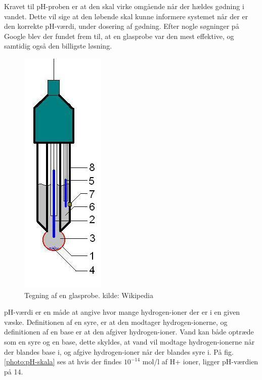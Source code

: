 
Kravet til pH-proben er at den skal virke omgående når der hældes gødning i vandet. Dette vil sige at den løbende skal kunne informere systemet når der er den korrekte pH-værdi, under dosering af gødning. Efter nogle søgninger på Google blev der fundet frem til, at en glasprobe var den mest effektive, og samtidig også den billigste løsning. 

\begin{figure}[H]
	\centering 
	\includegraphics[scale=0.7]{HardwareArkitektur/Sensore/pH_probe_billeder/Glass_electrode_wiki.jpg}
	\caption{Tegning af en glasprobe. kilde: Wikipedia}
	\label{photo:pH-probe}
\end{figure}     

pH-værdi er en måde at angive hvor mange hydrogen-ioner der er i en given væske. Definitionen af en syre, er at den modtager hydrogen-ionerne, og definitionen af en base er at den afgiver hydrogen-ioner. Vand kan både optræde som en syre og en base, dette skyldes, at vand vil modtage hydrogen-ionerne når der blandes base i, og afgive hydrogen-ioner når der blandes syre i. På fig. \ref{photo:pH-skala} ses at hvis der findes $10^{-14}$ mol/l af H+ ioner, ligger pH-værdien på 14. 

